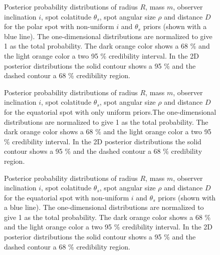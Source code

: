 \documentclass{wihuri}
\def\thetas{\theta_{s}}
\begin{document}
\begin{figure}
\centerline{}
\caption{Posterior probability distributions of radius $R$, mass $m$, observer inclination $i$, spot colatitude $\thetas$, spot angular size $\rho$ and distance $D$ for the polar spot with non-uniform $i$ and $\thetas$ priors (shown with a blue line). The one-dimensional distributions are normalized to give 1 as the total probability. The dark orange color shows a 68 \% and the light orange color a two 95 \% credibility interval. In the 2D posterior distributions the solid contour shows a 95 \% and the dashed contour a 68 \% credibility region.
\label{fig:polpostpr}}
\end{figure}



\begin{figure}
\centerline{}
\caption{Posterior probability distributions of radius $R$, mass $m$, observer inclination $i$, spot colatitude $\thetas$, spot angular size $\rho$ and distance $D$ for the equatorial spot with only uniform priors.The one-dimensional distributions are normalized to give 1 as the total probability. The dark orange color shows a 68 \% and the light orange color a two 95 \% credibility interval. In the 2D posterior distributions the solid contour shows a 95 \% and the dashed contour a 68 \% credibility region.
\label{fig:eqpost}}
\end{figure}



\begin{figure}
\centerline{}
\caption{Posterior probability distributions of radius $R$, mass $m$, observer inclination $i$, spot colatitude $\theta_{s}$, spot angular size $\rho$ and distance $D$ for the equatorial spot with non-uniform $i$ and $\thetas$ priors (shown with a blue line). The one-dimensional distributions are normalized to give 1 as the total probability. The dark orange color shows a 68 \% and the light orange color a two 95 \% credibility interval. In the 2D posterior distributions the solid contour shows a 95 \% and the dashed contour a 68 \% credibility region.
\label{fig:eqpostpr}}
\end{figure}
\end{document}
